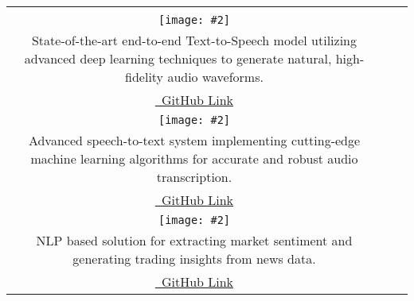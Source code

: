\documentclass[b3paper]{article}
\makeatletter
\newcommand{\projectrow}[3]{%
    \begin{center}
    \begin{tabular}{@{}c@{\hspace{0.5cm}}c@{\hspace{0.5cm}}c@{}}
    #1 & #2 & #3
    \end{tabular}
    \end{center}
}
\newcommand{\nlpprojectbox}[4]{%
    \begin{tcolorbox}[
        colback=boxcolor,
        width=0.32\textwidth,
        height=13.5cm,  %
        arc=5pt,
        box align=top,
        nobeforeafter,
        sharp corners=northwest
    ]
        \centering
        \fontsize{18pt}{20pt}\selectfont\textbf{#1}\\[0.5cm]
        \texttt{[image: \#2]}\\[0.3cm]
        \fontsize{14pt}{16pt}\selectfont #3\par
        \\[0.3cm]
        \href{#4}{\faGithub\ GitHub Link}
    \end{tcolorbox}%
}
\makeatother
\begin{document}
\projectrow
{\nlpprojectbox{Text-to-Speech / Voice Cloning}{assets/voice_cloning.png}
{State-of-the-art end-to-end Text-to-Speech model utilizing advanced deep learning techniques to generate natural, high-fidelity audio waveforms.}
{https://github.com/soheil-mp/VITS-Conditional-Variational-Autoencoder-with-Adversarial-Learning-}}
{\nlpprojectbox{Speech Recognition}{assets/speech_recognition.png}
{Advanced speech-to-text system implementing cutting-edge machine learning algorithms for accurate and robust audio transcription.}
{https://github.com/soheil-mp/Speech-Recognition}}
{\nlpprojectbox{News Trading Signal}{assets/trading_signal.png}
{NLP based solution for extracting market sentiment and generating trading insights from news data.}
{https://github.com/soheil-mp/news-trading-signal}}
\end{document}
